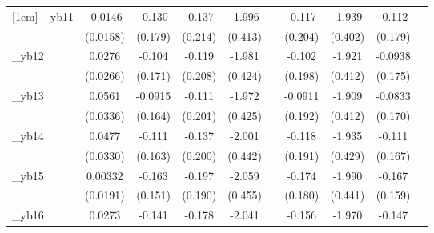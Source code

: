 \begin{table}[htbp]
\begin{tabular}{l*{9}{c}}
[1em]
\_yb11       &     -0.0146         &      -0.130         &      -0.137         &      -1.996\sym{***}&                     &      -0.117         &      -1.939\sym{***}&      -0.112         &                     \\
            &    (0.0158)         &     (0.179)         &     (0.214)         &     (0.413)         &                     &     (0.204)         &     (0.402)         &     (0.179)         &                     \\
[1em]
\_yb12       &      0.0276         &      -0.104         &      -0.119         &      -1.981\sym{***}&                     &      -0.102         &      -1.921\sym{***}&     -0.0938         &                     \\
            &    (0.0266)         &     (0.171)         &     (0.208)         &     (0.424)         &                     &     (0.198)         &     (0.412)         &     (0.175)         &                     \\
[1em]
\_yb13       &      0.0561\sym{*}  &     -0.0915         &      -0.111         &      -1.972\sym{***}&                     &     -0.0911         &      -1.909\sym{***}&     -0.0833         &                     \\
            &    (0.0336)         &     (0.164)         &     (0.201)         &     (0.425)         &                     &     (0.192)         &     (0.412)         &     (0.170)         &                     \\
[1em]
\_yb14       &      0.0477         &      -0.111         &      -0.137         &      -2.001\sym{***}&                     &      -0.118         &      -1.935\sym{***}&      -0.111         &                     \\
            &    (0.0330)         &     (0.163)         &     (0.200)         &     (0.442)         &                     &     (0.191)         &     (0.429)         &     (0.167)         &                     \\
[1em]
\_yb15       &     0.00332         &      -0.163         &      -0.197         &      -2.059\sym{***}&                     &      -0.174         &      -1.990\sym{***}&      -0.167         &                     \\
            &    (0.0191)         &     (0.151)         &     (0.190)         &     (0.455)         &                     &     (0.180)         &     (0.441)         &     (0.159)         &                     \\
[1em]
\_yb16       &      0.0273         &      -0.141         &      -0.178         &      -2.041\sym{***}&                     &      -0.156         &      -1.970\sym{***}&      -0.147         &                     \\

\end{tabular}
\end{table}
